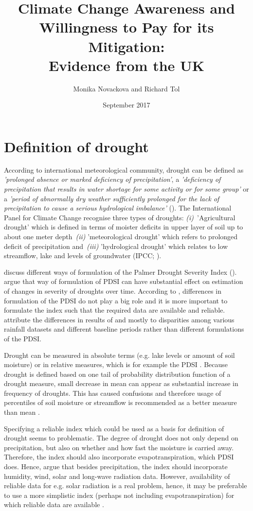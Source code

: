 \documentclass[a4paper,12pt]{article}
\date{\normalsize{September 2017}}
\title{\Large \bf Climate Change Awareness and Willingness to Pay for its Mitigation: \\ Evidence from the UK}
\author{Monika Novackova and Richard Tol}
\affil{\small{Department of Economics, University of Sussex, Falmer, UK}}
\begin{document}
\sloppy
\section*{Definition of drought}
 According to international meteorological community, drought can be defined as \textit{ 'prolonged absence or marked deficiency of precipitation'}, a \textit{'deficiency of precipitation that results in water shortage for some activity or for some group'} or a \textit{'period of abnormally dry weather sufficiently prolonged for the lack of precipitation to cause a serious hydrological imbalance'} (\citealp{IPCCtrenberth, Heim2002}). The International Panel for Climate Change recognise three types of droughts: \textit{(i)}~'Agricultural drought' which is defined in terms of moister deficits in upper layer of soil up to about one meter depth~\textit{(ii)} 'meteorological drought' which refers to prolonged deficit of precipitation and~\textit{(iii)} 'hydrological drought' which relates to low streamflow, lake and levels of groundwater (IPCC; \citealp{IPCCtrenberth, Heim2002}). 
 
 \cite{Trenberth2014} discuss different ways of formulation of the Palmer Drought Severity Index (\citealt{Sheffield2012, Dai2011}).  \cite{Sheffield2012} argue that way of formulation of PDSI can have substantial effect on estimation of changes in severity of droughts over time. According to \cite{Trenberth2014}, differences in formulation of the PDSI do not play a big role and it is more important to formulate the index such that the required data are available and reliable. \cite{Trenberth2014} attribute the differences in results of  \cite{Sheffield2012} and \cite{Trenberth2014} mostly to disparities among various rainfall datasets and different baseline periods rather than different formulations of the PDSI.   

Drought can be measured in absolute terms (e.g. lake levels or amount of soil moisture) or in relative measures, which is for example the  PDSI \citep{Trenberth2014}. Because drought is defined based on one tail of probability distribution function of a drought measure, small decrease in mean can appear as substantial increase in frequency of droughts. This has caused confusions and therefore usage of percentiles of soil moisture or streamflow is recommended as a better measure than mean \citep{Trenberth2014}.

Specifying a reliable index which could be used as a basis for definition of drought seems to problematic. The degree of drought does not only depend on precipitation, but also on whether and how fast the moisture is carried away. Therefore, the index should also incorporate evapotranspiration, which PDSI does. Hence, \cite{vanderSchrier2011} argue that besides precipitation, the index should incorporate humidity, wind, solar and long-wave radiation data.   However, availability of reliable data for e.g. solar radiation is a real problem, hence, it may be preferable to use a more simplistic index (perhaps not including evapotranspiration) for which reliable data are available \citep{Wang2012}.
\end{document}
